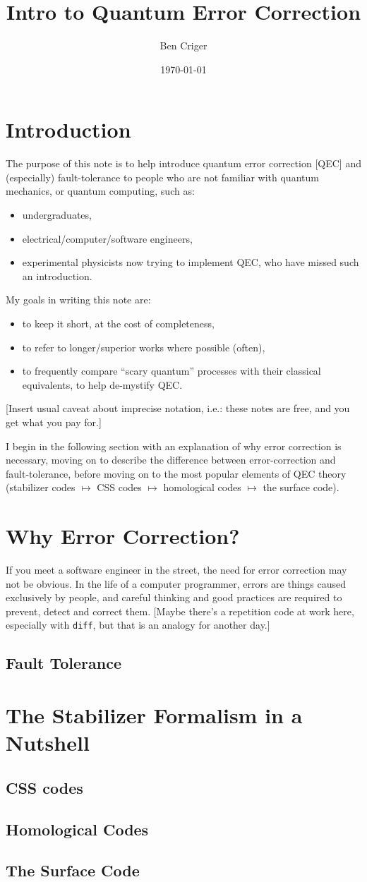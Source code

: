 \documentclass[10pt,a4paper, english]{scrartcl}
\title{Intro to Quantum Error Correction}
\author{Ben Criger}
\date{\today}
\begin{document}
\maketitle
\section{Introduction}
The purpose of this note is to help introduce quantum error correction [QEC] and (especially) fault-tolerance to people who are not familiar with quantum mechanics, or quantum computing, such as:
\begin{itemize}
\item undergraduates,
\item electrical/computer/software engineers,
\item experimental physicists now trying to implement QEC, who have missed such an introduction.
\end{itemize}
My goals in writing this note are:
\begin{itemize}
\item to keep it short, at the cost of completeness,
\item to refer to longer/superior works where possible (often),
\item to frequently compare ``scary quantum'' processes with their classical equivalents, to help de-mystify QEC.
\end{itemize}
[Insert usual caveat about imprecise notation, i.e.: these notes are free, and you get what you pay for.]

I begin in the following section with an explanation of why error correction is necessary, moving on to describe the difference between error-correction and fault-tolerance, before moving on to the most popular elements of QEC theory (stabilizer codes $\mapsto$ CSS codes $\mapsto$ homological codes $\mapsto$ the surface code). 
\section{Why Error Correction?}
If you meet a software engineer in the street, the need for error correction may not be obvious. 
In the life of a computer programmer, errors are things caused exclusively by people, and careful thinking and good practices are required to prevent, detect and correct them. 
[Maybe there's a repetition code at work here, especially with \texttt{diff}, but that is an analogy for another day.]
\subsection{Fault Tolerance}

\section{The Stabilizer Formalism in a Nutshell}
\subsection{CSS codes}
\subsection{Homological Codes}
\subsection{The Surface Code}
\end{document}
